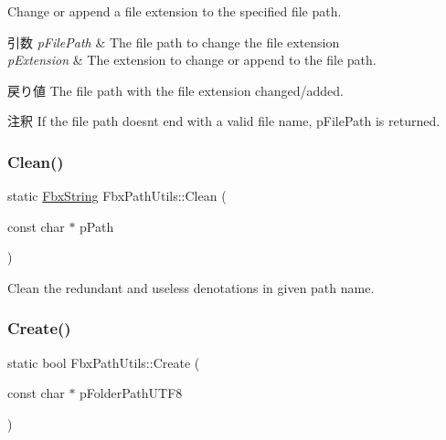 Change or append a file extension to the specified file path. 
\begin{DoxyParams}{引数}
{\em p\+File\+Path} & The file path to change the file extension \\
\hline
{\em p\+Extension} & The extension to change or append to the file path. \\
\hline
\end{DoxyParams}
\begin{DoxyReturn}{戻り値}
The file path with the file extension changed/added. 
\end{DoxyReturn}
\begin{DoxyRemark}{注釈}
If the file path doesn\textquotesingle{}t end with a valid file name, p\+File\+Path is returned. 
\end{DoxyRemark}
\mbox{\label{class_fbx_path_utils_a33d8212ceaa902e1161882ab8d69e3ca}} 
\subsubsection{\texorpdfstring{Clean()}{Clean()}}
{\footnotesize\ttfamily static \hyperlink{class_fbx_string}{Fbx\+String} Fbx\+Path\+Utils\+::\+Clean (\begin{DoxyParamCaption}\item[{const char $\ast$}]{p\+Path }\end{DoxyParamCaption})\hspace{0.3cm}{\ttfamily [static]}}



Clean the redundant and useless denotations in given path name. 

\mbox{\label{class_fbx_path_utils_aa644a8ad1e94eb8a522e6fd653824e93}} 
\subsubsection{\texorpdfstring{Create()}{Create()}}
{\footnotesize\ttfamily static bool Fbx\+Path\+Utils\+::\+Create (\begin{DoxyParamCaption}\item[{const char $\ast$}]{p\+Folder\+Path\+U\+T\+F8 }\end{DoxyParamCaption})\hspace{0.3cm}{\ttfamily [static]}}

